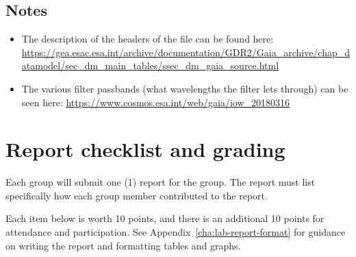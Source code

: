 \subsection{Notes}

\begin{itemize}
	\item The description of the headers of the file can be found here: \url{https://gea.esac.esa.int/archive/documentation/GDR2/Gaia_archive/chap_datamodel/sec_dm_main_tables/ssec_dm_gaia_source.html}
	
	\item The various filter passbands (what wavelengths the filter lets through) can be seen here: \url{https://www.cosmos.esa.int/web/gaia/iow_20180316}
\end{itemize}

\section{Report checklist and grading}

Each group will submit one (1) report for the group. The report must list specifically how each group member contributed to the report.

Each item below is worth 10 points, and there is an additional 10 points for attendance and participation. See Appendix\ \ref{cha:lab-report-format} for guidance on writing the report and formatting tables and graphs.

